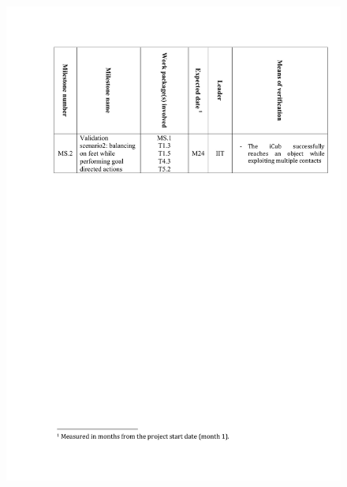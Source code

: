 \documentclass[12pt,a4paper,twoside]{article}
\begin{document}
\begin{figure}
\centering
\includegraphics[width=\textwidth]{./images/milestones.pdf}
\end{figure}

\newpage


% 

\end{document}
